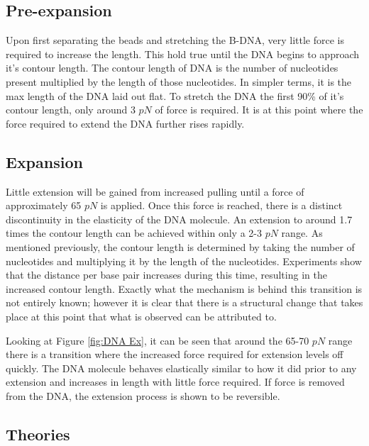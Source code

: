 \documentclass[%
 aip,
 amsmath,amssymb,
 reprint,%
]{revtex4-1}
\begin{document}
    \subsection{\label{sec:level2}Pre-expansion}
    Upon first separating the beads and stretching the B-DNA, very little force is required to increase the length. This hold true until the DNA begins to approach it's contour length. The contour length of DNA is the number of nucleotides present multiplied by the length of those nucleotides. In simpler terms, it is the max length of the DNA laid out flat. To stretch the DNA the first 90\% of it's contour length, only around 3 $pN$ of force is required\cite{extensible}. It is at this point where the force required to extend the DNA further rises rapidly. 




    \subsection{\label{sec:level2}Expansion}
    Little extension will be gained from increased pulling until a force of approximately 65 $pN$ is applied\cite{overstretching}. Once this force is reached, there is a distinct discontinuity in the elasticity of the DNA molecule. An extension to around 1.7 times the contour length can be achieved within only a 2-3 $pN$ range\cite{overstretching}. As mentioned previously, the contour length is determined by taking the number of nucleotides and multiplying it by the length of the nucleotides. Experiments show that the distance per base pair increases during this time, resulting in the increased contour length. Exactly what the mechanism is behind this transition is not entirely known; however it is clear that there is a structural change that takes place at this point that what is observed can be attributed to. 
    
    Looking at Figure \ref{fig:DNA Ex}, it can be seen that around the 65-70 $pN$ range there is a transition where the increased force required for extension levels off quickly. The DNA molecule behaves elastically similar to how it did prior to any extension and increases in length with little force required. If force is removed from the DNA, the extension process is shown to be reversible\cite{NIR}. 

    \subsection{\label{sec:level2}Theories}
    
\end{document}
